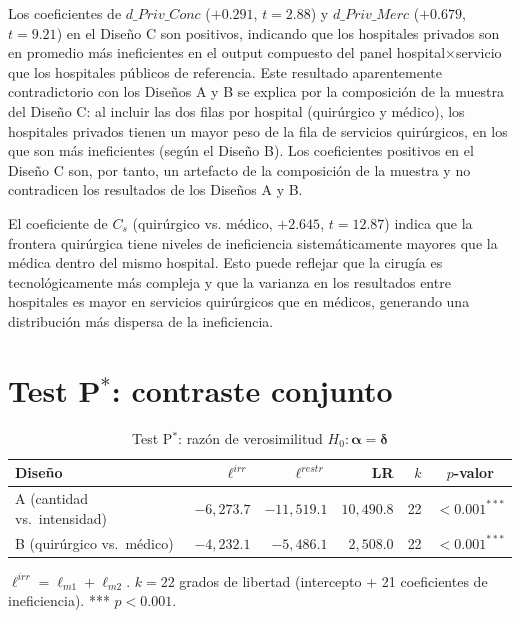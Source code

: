 \documentclass[12pt, a4paper, twoside, openright]{book}
\newcommand{\bsym}[1]{\boldsymbol{#1}}
\theoremstyle{plain}
\theoremstyle{definition}
\theoremstyle{remark}
\begin{document}
Los coeficientes de $d\_Priv\_Conc$ ($+0.291$, $t=2.88$) y $d\_Priv\_Merc$ ($+0.679$, $t=9.21$) en el Diseño C son positivos, indicando que los hospitales privados son en promedio más ineficientes en el output compuesto del panel hospital$\times$servicio que los hospitales públicos de referencia. Este resultado aparentemente contradictorio con los Diseños A y B se explica por la composición de la muestra del Diseño C: al incluir las dos filas por hospital (quirúrgico y médico), los hospitales privados tienen un mayor peso de la fila de servicios quirúrgicos, en los que son más ineficientes (según el Diseño B). Los coeficientes positivos en el Diseño C son, por tanto, un artefacto de la composición de la muestra y no contradicen los resultados de los Diseños A y B.

El coeficiente de $C_s$ (quirúrgico vs. médico, $+2.645$, $t=12.87$) indica que la frontera quirúrgica tiene niveles de ineficiencia sistemáticamente mayores que la médica dentro del mismo hospital. Esto puede reflejar que la cirugía es tecnológicamente más compleja y que la varianza en los resultados entre hospitales es mayor en servicios quirúrgicos que en médicos, generando una distribución más dispersa de la ineficiencia.


\section{Test \texorpdfstring{P$^*$}{P*}: contraste conjunto}
\label{sec:test_pstar}

\begin{table}[htbp]
\centering
\caption{Test P$^*$: razón de verosimilitud $H_0: \bsym{\alpha} = \bsym{\delta}$}
\label{tab:test_pstar}
\begin{threeparttable}
\begin{tabular}{lrrrrc}
\toprule
\textbf{Diseño} & $\ell^{irr}$ & $\ell^{restr}$ &
\textbf{LR} & $k$ & \textbf{$p$-valor} \\
\midrule
A (cantidad vs.\ intensidad) &
  $-6{,}273.7$ & $-11{,}519.1$ &
  $10{,}490.8$ & 22 & $<0.001^{***}$ \\
B (quirúrgico vs.\ médico) &
  $-4{,}232.1$ & $-5{,}486.1$ &
  $2{,}508.0$ & 22 & $<0.001^{***}$ \\
\bottomrule
\end{tabular}
\begin{tablenotes}
  \small
  \item $\ell^{irr} = \ell_{m1} + \ell_{m2}$. $k = 22$ grados de libertad (intercepto + 21 coeficientes de ineficiencia). *** $p<0.001$.
\end{tablenotes}
\end{threeparttable}
\end{table}
\end{document}
